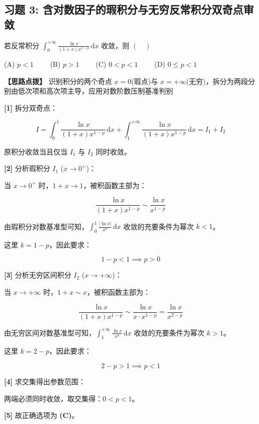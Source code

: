 \documentclass[11pt,a4paper,UTF8]{ctexart}
\begin{document}
\subsection{习题 3: 含对数因子的瑕积分与无穷反常积分双奇点审敛}

若反常积分 $\int_0^{+\infty} \frac{\ln x}{(1+x)x^{1-p}}\,\mathrm{d}x$ 收敛，则 $(\quad)$

(A) $p < 1 \qquad$ (B) $p > 1 \qquad$ (C) $0 < p < 1 \qquad$ (D) $0 \leqslant p < 1$

\textbf{\color{DeepPurple}【思路点拨】} 识别积分的两个奇点 $x = 0$(瑕点)与 $x = +\infty$(无穷)，拆分为两段分别由低次项和高次项主导，应用对数阶数压制基准判别


\begin{solbox}[分步推导与答题规范]
\textbf{[1]} 拆分双奇点：


\begin{equation*}
I = \int_0^1 \frac{\ln x}{(1+x)x^{1-p}}\,\mathrm{d}x + \int_1^{+\infty} \frac{\ln x}{(1+x)x^{1-p}}\,\mathrm{d}x = I_1 + I_2
\end{equation*}


原积分收敛当且仅当 $I_1$ 与 $I_2$ 同时收敛。

\textbf{[2]} 分析瑕积分 $I_1$ ($x \to 0^+$)：

当 $x \to 0^+$ 时，$1+x \to 1$，被积函数主部为：


\begin{equation*}
\frac{\ln x}{(1+x)x^{1-p}} \sim \frac{\ln x}{x^{1-p}}
\end{equation*}


由瑕积分对数基准型可知，$\int_0^1 \frac{\vert{}\ln x\vert{}}{x^k}\,\mathrm{d}x$ 收敛的充要条件为幂次 $k < 1$。

这里 $k = 1 - p$，因此要求：


\begin{equation*}
1 - p < 1 \implies p > 0
\end{equation*}


\textbf{[3]} 分析无穷区间积分 $I_2$ ($x \to +\infty$)：

当 $x \to +\infty$ 时，$1+x \sim x$，被积函数主部为：


\begin{equation*}
\frac{\ln x}{(1+x)x^{1-p}} \sim \frac{\ln x}{x \cdot x^{1-p}} = \frac{\ln x}{x^{2-p}}
\end{equation*}


由无穷区间对数基准型可知，$\int_1^{+\infty} \frac{\ln x}{x^k}\,\mathrm{d}x$ 收敛的充要条件为幂次 $k > 1$。

这里 $k = 2 - p$，因此要求：


\begin{equation*}
2 - p > 1 \implies p < 1
\end{equation*}


\textbf{[4]} 求交集得出参数范围：

两端必须同时收敛，取交集得：$0 < p < 1$。

\textbf{[5]} 故正确选项为 \textbf{(C)}。
\end{solbox}
\end{document}
